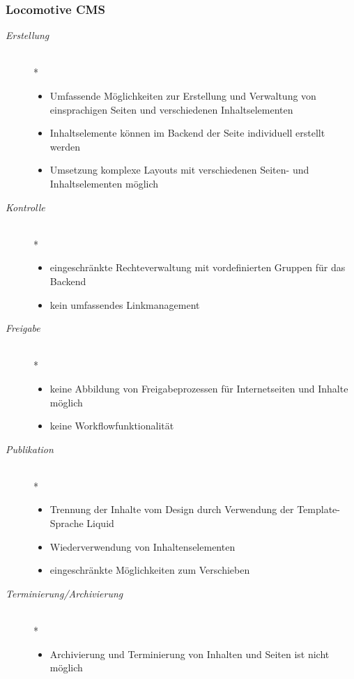 \newpage
\subsubsection{Locomotive CMS}

\begin{description}
\item[\emph{Erstellung}]\mbox{~}\\*
\begin{itemize}
	\item Umfassende Möglichkeiten zur Erstellung und Verwaltung von einsprachigen Seiten und verschiedenen Inhaltselementen
	\item Inhaltselemente können im Backend der Seite individuell erstellt werden
	\item Umsetzung komplexe Layouts mit verschiedenen Seiten- und Inhaltselementen möglich
\end{itemize}
\item[\emph{Kontrolle}]\mbox{~}\\*
\begin{itemize}
	\item eingeschränkte Rechteverwaltung mit vordefinierten Gruppen für das Backend
	\item kein umfassendes Linkmanagement
\end{itemize}
\item[\emph{Freigabe}]\mbox{~}\\*
\begin{itemize}
	\item keine Abbildung von Freigabeprozessen für Internetseiten und Inhalte möglich
	\item keine Workflowfunktionalität
\end{itemize}
\item[\emph{Publikation}]\mbox{~}\\*
\begin{itemize}
	\item Trennung der Inhalte vom Design durch Verwendung der Template-Sprache Liquid
	\item Wiederverwendung von Inhaltenselementen
	\item eingeschränkte Möglichkeiten zum Verschieben
\end{itemize}
\item[\emph{Terminierung/Archivierung}]\mbox{~}\\*
\begin{itemize}
	\item Archivierung und Terminierung von Inhalten und Seiten ist nicht möglich
\end{itemize}
\end{description}

